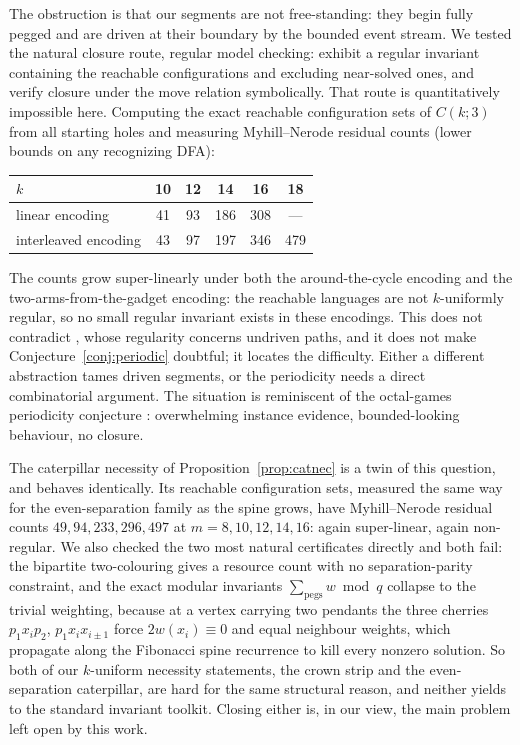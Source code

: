 \documentclass[11pt]{article}
\theoremstyle{definition}
\begin{document}
The obstruction is that our segments are not free-standing: they
begin fully pegged and are driven at their boundary by the bounded
event stream. We tested the natural closure route, regular model
checking: exhibit a regular invariant containing the reachable
configurations and excluding near-solved ones, and verify closure
under the move relation symbolically. That route is quantitatively
impossible here. Computing the exact reachable configuration sets of
$C(k;3)$ from all starting holes and measuring Myhill--Nerode
residual counts (lower bounds on any recognizing DFA):

\begin{center}\small
\begin{tabular}{lccccc}
\toprule
$k$ & 10 & 12 & 14 & 16 & 18\\
\midrule
linear encoding & 41 & 93 & 186 & 308 & ---\\
interleaved encoding & 43 & 97 & 197 & 346 & 479\\
\bottomrule
\end{tabular}
\end{center}

The counts grow super-linearly under both the around-the-cycle
encoding and the two-arms-from-the-gadget encoding: the reachable
languages are not $k$-uniformly regular, so no small regular
invariant exists in these encodings. This does not contradict
\cite{ME}, whose regularity concerns undriven paths, and it does not
make Conjecture~\ref{conj:periodic} doubtful; it locates the
difficulty. Either a different abstraction tames driven segments, or
the periodicity needs a direct combinatorial argument. The situation
is reminiscent of the octal-games periodicity conjecture
\cite{GuyNowakowski}: overwhelming instance evidence, bounded-looking
behaviour, no closure.

The caterpillar necessity of Proposition~\ref{prop:catnec} is a twin
of this question, and behaves identically. Its reachable
configuration sets, measured the same way for the even-separation
family as the spine grows, have Myhill--Nerode residual counts
$49, 94, 233, 296, 497$ at $m=8,10,12,14,16$: again super-linear,
again non-regular. We also checked the two most natural certificates
directly and both fail: the bipartite two-colouring gives a resource
count with no separation-parity constraint, and the exact modular
invariants $\sum_{\mathrm{pegs}} w \bmod q$ collapse to the trivial
weighting, because at a vertex carrying two pendants the three
cherries $p_1 x_i p_2$, $p_1 x_i x_{i\pm1}$ force $2w(x_i)\equiv 0$
and equal neighbour weights, which propagate along the Fibonacci
spine recurrence to kill every nonzero solution. So both of our $k$-uniform necessity statements, the crown strip and
the even-separation caterpillar, are hard for the same structural
reason, and neither yields to the standard invariant toolkit. Closing
either is, in our view, the main problem left open by this work.
\end{document}
